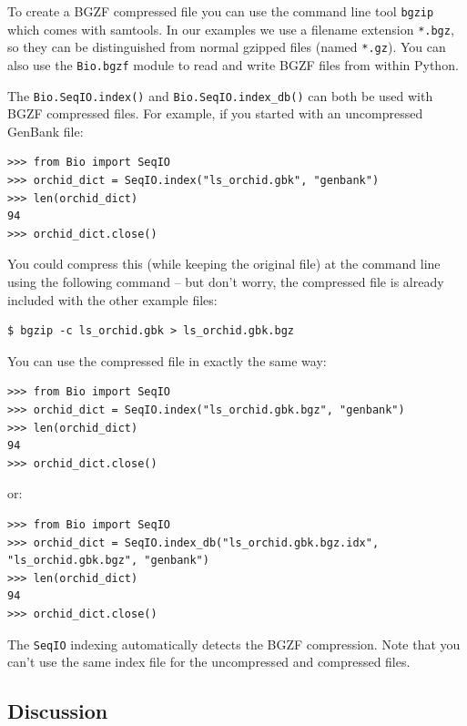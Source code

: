 \documentclass{report}
\begin{document}
To create a BGZF compressed file you can use the command line tool \verb|bgzip|
which comes with samtools. In our examples we use a filename extension
\verb|*.bgz|, so they can be distinguished from normal gzipped files (named
\verb|*.gz|). You can also use the \verb|Bio.bgzf| module to read and write
BGZF files from within Python.

The \verb|Bio.SeqIO.index()| and \verb|Bio.SeqIO.index_db()| can both be
used with BGZF compressed files. For example, if you started with an
uncompressed GenBank file:

\begin{verbatim}
>>> from Bio import SeqIO
>>> orchid_dict = SeqIO.index("ls_orchid.gbk", "genbank")
>>> len(orchid_dict)
94
>>> orchid_dict.close()
\end{verbatim}

You could compress this (while keeping the original file) at the command
line using the following command -- but don't worry, the compressed file
is already included with the other example files:

\begin{verbatim}
$ bgzip -c ls_orchid.gbk > ls_orchid.gbk.bgz
\end{verbatim}

You can use the compressed file in exactly the same way:

\begin{verbatim}
>>> from Bio import SeqIO
>>> orchid_dict = SeqIO.index("ls_orchid.gbk.bgz", "genbank")
>>> len(orchid_dict)
94
>>> orchid_dict.close()
\end{verbatim}

\noindent
or:

\begin{verbatim}
>>> from Bio import SeqIO
>>> orchid_dict = SeqIO.index_db("ls_orchid.gbk.bgz.idx", "ls_orchid.gbk.bgz", "genbank")
>>> len(orchid_dict)
94
>>> orchid_dict.close()
\end{verbatim}

The \verb|SeqIO| indexing automatically detects the BGZF compression. Note
that you can't use the same index file for the uncompressed and compressed files.

\subsection{Discussion}
\label{sec:SeqIO-indexing-discussion}
\end{document}

